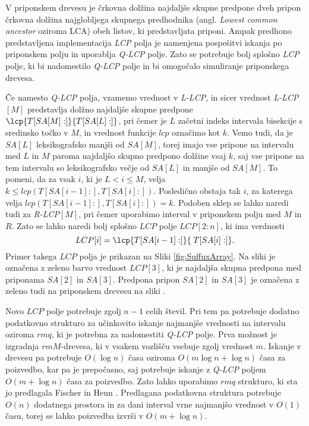V priponskem drevesu je črkovna dolžina najdaljše skupne predpone dveh pripon črkovna dolžina najglobljega skupnega predhodnika (angl. \textit{Lowest common ancestor} oziroma LCA) obeh listov, ki predstavljata priponi. Ampak predhono predstavljena implementacija \textit{LCP} polja je namenjena pospešitvi iskanja po priponskem polju in uporablja \textit{Q-LCP} polje. Zato se potrebuje bolj splošno \textit{LCP} polje, ki bi nadomestilo \textit{Q-LCP} polje in bi omogočalo simuliranje priponskega drevesa.

Če namesto \textit{Q-LCP} polja, vzamemo vrednost v \textit{L-LCP}, in sicer vrednost \textit{L-LCP}$[M]$ predstavlja dolžno najdaljše skupne predpone $\lcp{T[SA[M]:]}{T[SA[L]:]}$, pri čemer je $L$ začetni indeks intervala bisekcije s sredinsko točko v $M$, in vrednost funkcije $lcp$ označimo kot $k$. Vemo tudi, da je $SA[L]$ leksikografsko manjši od $SA[M]$, torej imajo vse pripone na intervalu med $L$ in $M$ paroma najdaljšo skupno predpono dolžine vsaj $k$, saj vse pripone na tem intervalu so leksikografsko večje od $SA[L]$ in manjše od $SA[M]$. To pomeni, da za vsak $i$, ki je $L<i\le M$, velja $k\le lcp(T[SA[i-1]:], T[SA[i]:])$. Posledično obstaja tak $i$, za katerega velja $lcp(T[SA[i-1]:], T[SA[i]:])=k$. Podoben sklep se lahko naredi tudi za \textit{R-LCP}$[M]$, pri čemer uporabimo interval v priponskem polju med $M$ in $R$. Zato se lahko naredi bolj splošno $LCP$ polje $LCP[2:n]$, ki ima verdnosti 
$$
    LCP[i]=\lcp{T[SA[i-1]:]}{\; T[SA[i]:]}.
$$
Primer takega $LCP$ polja je prikazan na Sliki \ref{fig:SuffuxArray}. Na sliki je označena z zeleno barvo vrednost $LCP[3]$, ki je najdaljša skupna predpona med priponama $SA[2]$ in $SA[3]$. Predpona pripon $SA[2]$ in $SA[3]$ je označena z zeleno tudi na priponskem drevesu na sliki \cite{Abouelhoda2004, Kasai2001}.

Novo $LCP$ polje potrebuje zgolj $n-1$ celih števil. Pri tem pa potrebuje dodatno podatkovno strukturo za učinkovito iskanje najmanjše vrednosti na intervalu oziroma $rmq$, ki je potrebna za nadomestiti \textit{Q-LCP} polje. Prva možnost je izgradnja $rmM$-drevesa, ki v vsakem vozlišču vsebuje zgolj vrednost $m$. Iskanje v drevesu pa potrebuje $O(\log{n})$ časa oziroma $O(m\log{n}+\log{n})$ časa za poizvedbo, kar pa je prepočasno, saj potrebuje iskanje z \textit{Q-LCP} poljem $O(m+\log{n})$ časa za poizvedbo. Zato lahko uporabimo $rmq$ strukturo, ki sta jo predlagala Fischer in Heun \cite{Fischer2007}. Predlagana podatkovna struktura potrebuje $O(n)$ dodatnega prostora in za dani interval vrne najmanjšo vrednost v $O(1)$ času, torej se lahko poizvedba izvrši v $O(m+\log{n})$.

